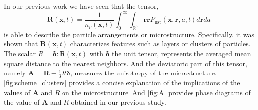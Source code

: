 In our previous work \citep{fintzi2024buoyancy} we have seen that the tensor,
\begin{equation}
    \textbf{R}(\textbf{x},t)
    = \frac{1}{n_p(\textbf{x},t)}
    \int_0^\infty 
    \int_{\mathbb{R}^3}
    \textbf{rr}
    P_\text{nst}(\textbf{x},\textbf{r},a,t)
    d\textbf{r}
    da
    \label{eq:R}
\end{equation}
is able to describe the particle arrangements or microstructure.
Specifically, it was shown that $\textbf{R}(\textbf{x},t)$ characterizes features such as layers or clusters of particles. 
The scalar $R = \bm\delta:\textbf{R}(\textbf{x},t)$ with $\bm\delta$ the unit tensor, represents the averaged mean square distance to the nearest neighbors.
And the deviatoric part of this tensor, namely $\textbf{A} = \textbf{R}-\frac{1}{3}R\bm\delta$, measures the anisotropy of the microstructure. 
\ref{fig:scheme_clusters} provides a concise explanation of the implications of the values of $\textbf{A}$ and $R$ on the microstructure.  
And \ref{fig:A} provides phase diagrams of the value of $\textbf{A}$ and $R$ obtained in our previous study. 
